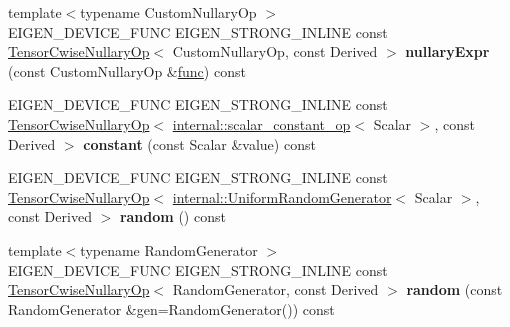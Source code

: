 \begin{DoxyCompactItemize}
\mbox{\label{class_eigen_1_1_tensor_base_3_01_derived_00_01_read_only_accessors_01_4_a0205b14457f9eb4575b3f0562fc80ca5}} 
{\footnotesize template$<$typename Custom\+Nullary\+Op $>$ }\\E\+I\+G\+E\+N\+\_\+\+D\+E\+V\+I\+C\+E\+\_\+\+F\+U\+NC E\+I\+G\+E\+N\+\_\+\+S\+T\+R\+O\+N\+G\+\_\+\+I\+N\+L\+I\+NE const \hyperlink{class_eigen_1_1_tensor_cwise_nullary_op}{Tensor\+Cwise\+Nullary\+Op}$<$ Custom\+Nullary\+Op, const Derived $>$ {\bfseries nullary\+Expr} (const Custom\+Nullary\+Op \&\hyperlink{structfunc}{func}) const
\item 
\mbox{\label{class_eigen_1_1_tensor_base_3_01_derived_00_01_read_only_accessors_01_4_ad5507588c96d525fc159cdbaf48a8523}} 
E\+I\+G\+E\+N\+\_\+\+D\+E\+V\+I\+C\+E\+\_\+\+F\+U\+NC E\+I\+G\+E\+N\+\_\+\+S\+T\+R\+O\+N\+G\+\_\+\+I\+N\+L\+I\+NE const \hyperlink{class_eigen_1_1_tensor_cwise_nullary_op}{Tensor\+Cwise\+Nullary\+Op}$<$ \hyperlink{struct_eigen_1_1internal_1_1scalar__constant__op}{internal\+::scalar\+\_\+constant\+\_\+op}$<$ Scalar $>$, const Derived $>$ {\bfseries constant} (const Scalar \&value) const
\item 
\mbox{\label{class_eigen_1_1_tensor_base_3_01_derived_00_01_read_only_accessors_01_4_a243890358686131ca02db2a9cd48b1d6}} 
E\+I\+G\+E\+N\+\_\+\+D\+E\+V\+I\+C\+E\+\_\+\+F\+U\+NC E\+I\+G\+E\+N\+\_\+\+S\+T\+R\+O\+N\+G\+\_\+\+I\+N\+L\+I\+NE const \hyperlink{class_eigen_1_1_tensor_cwise_nullary_op}{Tensor\+Cwise\+Nullary\+Op}$<$ \hyperlink{class_eigen_1_1internal_1_1_uniform_random_generator}{internal\+::\+Uniform\+Random\+Generator}$<$ Scalar $>$, const Derived $>$ {\bfseries random} () const
\item 
\mbox{\label{class_eigen_1_1_tensor_base_3_01_derived_00_01_read_only_accessors_01_4_ae0965096d4c989ca0a6061de9bb08c74}} 
{\footnotesize template$<$typename Random\+Generator $>$ }\\E\+I\+G\+E\+N\+\_\+\+D\+E\+V\+I\+C\+E\+\_\+\+F\+U\+NC E\+I\+G\+E\+N\+\_\+\+S\+T\+R\+O\+N\+G\+\_\+\+I\+N\+L\+I\+NE const \hyperlink{class_eigen_1_1_tensor_cwise_nullary_op}{Tensor\+Cwise\+Nullary\+Op}$<$ Random\+Generator, const Derived $>$ {\bfseries random} (const Random\+Generator \&gen=Random\+Generator()) const

\end{DoxyCompactItemize}
